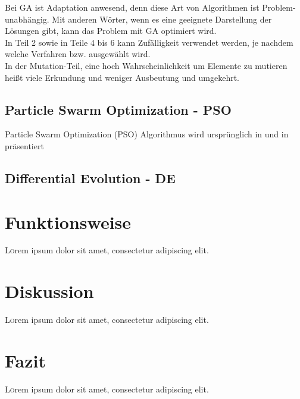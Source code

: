 \documentclass[twoside,twocolumn]{article}
\begin{document}
Bei GA ist Adaptation anwesend, denn diese Art von Algorithmen ist Problem-unabhängig. Mit anderen Wörter, wenn es eine geeignete Darstellung der Lösungen gibt, kann das Problem mit GA optimiert wird.\\
In Teil 2 sowie in Teile 4 bis 6 kann Zufälligkeit verwendet werden, je nachdem welche Verfahren bzw. ausgewählt wird.\\
In der Mutation-Teil, eine hoch Wahrscheinlichkeit um Elemente zu mutieren heißt viele Erkundung und weniger Ausbeutung und umgekehrt.

\subsection{Particle Swarm Optimization - PSO}
Particle Swarm Optimization (PSO) Algorithmus wird ursprünglich in \cite{kennedy_pso} und in \cite{shi_pso} präsentiert

\subsection{Differential Evolution - DE}
\blindtext %


\section{Funktionsweise}

\lettrine[nindent=0em,lines=3]{L} orem ipsum dolor sit amet, consectetur adipiscing elit.
\blindtext %


\section{Diskussion}

\lettrine[nindent=0em,lines=3]{L} orem ipsum dolor sit amet, consectetur adipiscing elit.
\blindtext %


\section{Fazit}

\lettrine[nindent=0em,lines=3]{L} orem ipsum dolor sit amet, consectetur adipiscing elit.
\blindtext %


\renewcommand{\refname}{Quellenverzeichnis}




\end{document}
